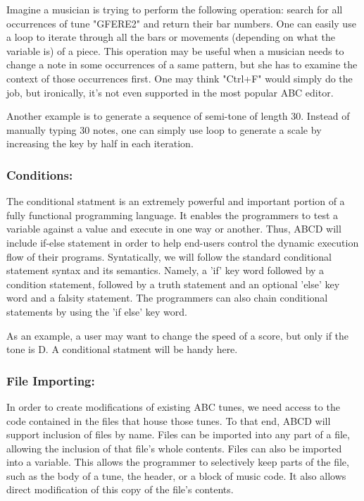 	Imagine a musician is trying to perform the following operation: search for all occurrences of tune "GFERE2" and return their bar numbers. One can easily use a loop to iterate through all the bars or movements (depending on what the variable is) of a piece. This operation may be useful when a musician needs to change a note in some occurrences of a same pattern, but she has to examine the context of those occurrences first. One may think "Ctrl+F" would simply do the job, but ironically, it's not even supported in the most popular ABC editor\cite{SlashdotMedia17}.  

	Another example is to generate a sequence of semi-tone of length 30. Instead of manually typing 30 notes, one can simply use loop to generate a scale by increasing the key by half in each iteration.

	\subsubsection{Conditions:}
		The conditional statment is an extremely powerful and important portion of a fully functional programming language. It enables the programmers to test a variable against a value and execute in one way or another. Thus, ABCD will include if-else statement in order to help end-users control the dynamic execution flow of their programs. Syntatically, we will follow the standard conditional statement syntax and its semantics. Namely, a 'if' key word followed by a condition statement, followed by a truth statement and an optional 'else' key word and a falsity statement. The programmers can also chain conditional statements by using the 'if else' key word.

		As an example, a user may want to change the speed of a score, but only if the tone is D. A conditional statment will be handy here.
	\subsubsection{File Importing:}
	In order to create modifications of existing ABC tunes, we need access to the code contained in the files that house those tunes. To that end, ABCD will support inclusion of files by name. Files can be imported into any part of a file, allowing the inclusion of that file’s whole contents. Files can also be imported into a variable. This allows the programmer to selectively keep parts of the file, such as the body of a tune, the header, or a block of music code. It also allows direct modification of this copy of the file’s contents. 
	
